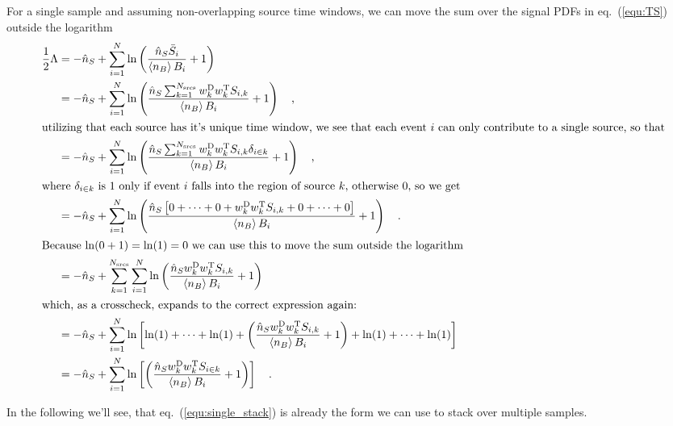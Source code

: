 For a single sample and assuming non-overlapping source time windows, we can move the sum over the signal PDFs in eq.~(\ref{equ:TS}) outside the logarithm
\begin{align}
  \frac{1}{2}\Lambda
    &= -\hat{n}_S + \sum_{i=1}^N \ln\left(\frac{\hat{n}_S\bar{S}_i}
                                               {\Braket{n_B} B_i} + 1\right) \\
    &= -\hat{n}_S + \sum_{i=1}^N \ln\left(
          \frac{\hat{n}_S\sum_{k=1}^{N_\text{srcs}}
                w_k^\text{D}w_k^\text{T}S_{i,k}}
               {\Braket{n_B} B_i} + 1\right) \quad\text{,} \\
  \intertext{utilizing that each source has it's unique time window, we see that each event $i$ can only contribute to a single source, so that}
    &= -\hat{n}_S + \sum_{i=1}^N \ln\left(
          \frac{\hat{n}_S\sum_{k=1}^{N_\text{srcs}}
                w_k^\text{D}w_k^\text{T}S_{i,k}\delta_{i\in k}}
               {\Braket{n_B} B_i} + 1\right) \quad\text{,} \\
  \intertext{where $\delta_{i\in k}$ is $1$ only if event $i$ falls into the region of source $k$, otherwise $0$, so we get}
    &= -\hat{n}_S + \sum_{i=1}^N \ln\left(
          \frac{\hat{n}_S
                \left[0 + \dots + 0 +
                      w_k^\text{D}w_k^\text{T}S_{i,k} +
                      0 + \dots + 0\right]}
               {\Braket{n_B} B_i} + 1\right) \quad\text{.} \\
  \intertext{Because $\ln(0+1) = \ln(1) = 0$ we can use this to move the sum outside the logarithm}
    &= -\hat{n}_S + \sum_{k=1}^{N_\text{srcs}}\sum_{i=1}^N \ln\left(
          \frac{\hat{n}_S w_k^\text{D}w_k^\text{T}S_{i,k}}
               {\Braket{n_B} B_i} + 1\right)  \label{equ:single_stack} \\
  \intertext{which, as a crosscheck, expands to the correct expression again:}
    &= -\hat{n}_S + \sum_{i=1}^N \ln\left[
          \ln(1) + \dots + \ln(1) +
          \left( \frac{\hat{n}_S w_k^\text{D}w_k^\text{T}S_{i,k}}
                      {\Braket{n_B} B_i} + 1\right) +
          \ln(1) + \dots + \ln(1) \right] \\
    &= -\hat{n}_S + \sum_{i=1}^N \ln\left[ \left(
          \frac{\hat{n}_S w_k^\text{D}w_k^\text{T}S_{i\in k}}
               {\Braket{n_B} B_i} + 1\right) \right] \quad\text{.}
\end{align}

In the following we'll see, that eq.~(\ref{equ:single_stack}) is already the form we can use to stack over multiple samples.


